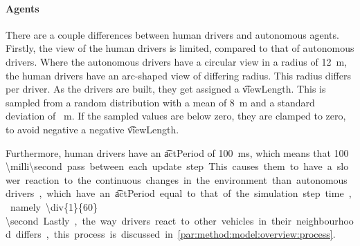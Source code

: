 

\paragraph{Agents}
There are a couple differences between human drivers and autonomous agents. Firstly, the view of the human drivers is limited, compared to that of autonomous drivers. Where the autonomous drivers have a circular view in a radius of \si{12 \meter}, the human drivers have an arc-shaped view of differing radius. This radius differs per driver. As the drivers are built, they get assigned a \t{viewLength}. This is sampled from a random distribution with a mean of \si{8 \meter} and a standard deviation of \si{ \meter}. If the sampled values are below zero, they are clamped to zero, to avoid negative a negative \t{viewLength}. 

Furthermore, human drivers have an \t{actPeriod} of \si{100\milli\second}, which means that \SI{100 \milli\second} pass between each update step. This causes them to have a slower reaction to the continuous changes in the environment than autonomous drivers, which have an \t{actPeriod} equal to that of the simulation step time, namely\SI{\div{1}{60} \second}. 

Lastly, the way drivers react to other vehicles in their neighbourhood differs, this process is discussed in  \cref{par:method:model:overview:process}. 



